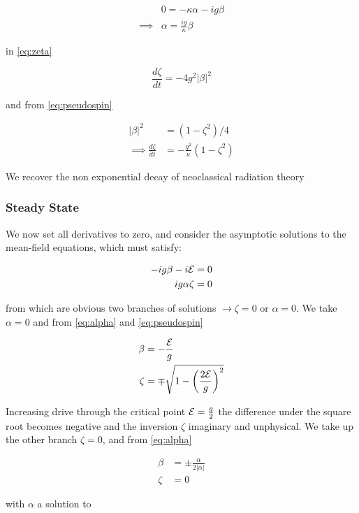 \begin{align}
  & 0 = -\kappa \alpha - ig \beta \\
  \implies & \alpha = \frac{ig}{\kappa} \beta
\end{align}

in \cref{eq:zeta}

\begin{equation}
  \frac{d \zeta}{dt} = -4 g^2 |\beta|^2
\end{equation}

and from \cref{eq:pseudospin}

\begin{align}
   |\beta|^2 &= (1-\zeta^2)/4 \\
\implies \frac{d \zeta}{dt} &= -\frac{g^2}{\kappa} (1-\zeta^2)
\end{align}

We recover the non exponential decay of neoclassical radiation theory

\subsubsection{Steady State}
We now set all derivatives to zero, and consider the asymptotic solutions to the mean-field equations, which must satisfy:

\begin{align}
  -ig \beta -i \mathcal{E} &= 0 \\
  ig\alpha \zeta &= 0
\end{align}

from which are obvious two branches of solutions $\rightarrow \zeta = 0$ or $\alpha = 0$. We take $\alpha = 0$ and from \cref{eq:alpha} and \cref{eq:pseudospin}

\begin{align}
  \beta &= -\frac{\mathcal{E}}{g} \\
  \zeta &= \mp \sqrt{1 - {\left( \frac{2\mathcal{E}}{g} \right)}^2}
\end{align}

Increasing drive through the critical point $\mathcal{E} = \frac{g}{2}$ the difference under the square root becomes negative and the inversion $\zeta$ imaginary and unphysical. We take up the other branch $\zeta = 0$, and from \cref{eq:alpha}

\begin{align}
  \beta &= \pm \frac{\alpha}{2|\alpha|} \\
  \zeta &= 0
\end{align}

with $\alpha$ a solution to

